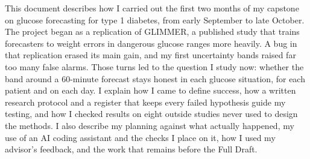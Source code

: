 This document describes how I carried out the first two months of my capstone on glucose forecasting for type 1 diabetes, from early September to late October. The project began as a replication of GLIMMER, a published study that trains forecasters to weight errors in dangerous glucose ranges more heavily. A bug in that replication erased its main gain, and my first uncertainty bands raised far too many false alarms. Those turns led to the question I study now: whether the band around a 60-minute forecast stays honest in each glucose situation, for each patient and on each day. I explain how I came to define success, how a written research protocol and a register that keeps every failed hypothesis guide my testing, and how I checked results on eight outside studies never used to design the methods. I also describe my planning against what actually happened, my use of an AI coding assistant and the checks I place on it, how I used my advisor's feedback, and the work that remains before the Full Draft.